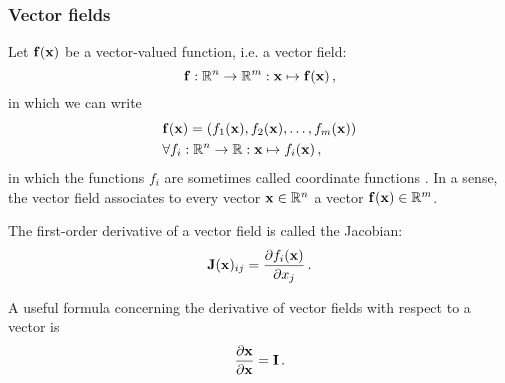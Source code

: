     \subsubsection{Vector fields}
        Let $\vb{f}(\vb{x})$ be a vector-valued function, i.e. a vector field:
        \begin{equation}
            \vb{f}: \mathbb{R}^n \rightarrow \mathbb{R}^m: \vb{x} \mapsto \vb{f}(\vb{x}) \thinspace ,
        \end{equation}
        in which we can write
        \begin{align} \label{eq:vector_field}
            &\vb{f}(\vb{x}) = (f_1(\vb{x}), f_2(\vb{x}), \dots, f_m(\vb{x})) \\
            &\forall f_i: \mathbb{R}^n \rightarrow \mathbb{R}: \vb{x} \mapsto f_i(\vb{x}) \thinspace ,
        \end{align}
        in which the functions $f_i$ are sometimes called coordinate functions \cite{burden2010}. In a sense, the vector field associates to every vector $\vb{x} \in \mathbb{R}^n$ a vector $\vb{f}(\vb{x}) \in \mathbb{R}^m$.

        The first-order derivative of a vector field is called the Jacobian:
        \begin{equation} \label{eq:jacobian}
            \vb{J}(\vb{x})_{ij} = \pdv{f_i(\vb{x})}{x_j} \thinspace .
        \end{equation}

        A useful formula concerning the derivative of vector fields with respect to a vector is
        \begin{align}
            \pdv{\vb{x}}{\vb{x}} = \vb{I} \thinspace .
        \end{align}
